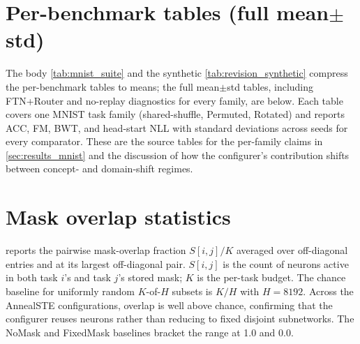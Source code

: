 \documentclass{article}
\begin{document}
\section{Per-benchmark tables (full mean$\pm$std)}\label{app:revision_tables}
The body \cref{tab:mnist_suite} and the synthetic \cref{tab:revision_synthetic} compress the per-benchmark tables to means; the full mean$\pm$std tables, including FTN+Router and no-replay diagnostics for every family, are below. Each table covers one MNIST task family (shared-shuffle, Permuted, Rotated) and reports ACC, FM, BWT, and head-start NLL with standard deviations across seeds for every comparator. These are the source tables for the per-family claims in \cref{sec:results_mnist} and the discussion of how the configurer's contribution shifts between concept- and domain-shift regimes.




\section{Mask overlap statistics}\label{app:mask_overlap}
 reports the pairwise mask-overlap fraction $S[i,j]/K$ averaged over off-diagonal entries and at its largest off-diagonal pair. $S[i,j]$ is the count of neurons active in both task $i$'s and task $j$'s stored mask; $K$ is the per-task budget. The chance baseline for uniformly random $K$-of-$H$ subsets is $K/H$ with $H=8192$. Across the AnnealSTE configurations, overlap is well above chance, confirming that the configurer reuses neurons rather than reducing to fixed disjoint subnetworks. The NoMask and FixedMask baselines bracket the range at 1.0 and 0.0.

\begin{table}[ht]
\centering
\small
\caption{Pairwise mask-overlap fraction $S[i,j]/K$ across configurations. ``mean off-diag'' averages over all $i\ne j$ entries; ``max off-diag'' is the largest pair per run, then averaged over seeds. Chance is the expected overlap for uniformly random $K$-of-$H$ subsets.}

\label{tab:mask_overlap}
\end{table}

\clearpage
\newpage

\end{document}
